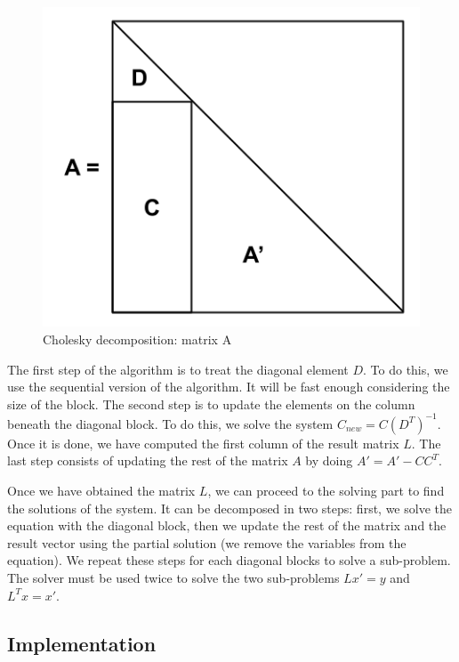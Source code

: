 \begin{figure}[!ht]
  \begin{center}
    \includegraphics[scale=0.4]{img/cho_block_dec_A.png}
    \caption{Cholesky decomposition: matrix A}
    \label{fig:chodeca}
  \end{center}
\end{figure}

The first step of the algorithm is to treat the diagonal element $D$. To do
this, we use the sequential version of the algorithm. It will be fast enough
considering the size of the block. The second step is to update the elements on
the column beneath the diagonal block. To do this, we solve the system $C_{new}
= C(D^{T})^{-1}$. Once it is done, we have computed the first column of the
result matrix $L$. The last step consists of updating the rest of the matrix $A$
by doing $A' = A' - CC^{T}$.

Once we have obtained the matrix $L$, we can proceed to the solving part to find
the solutions of the system. It can be decomposed in two steps: first, we solve
the equation with the diagonal block, then we update the rest of the matrix and
the result vector using the partial solution (we remove the variables from the
equation). We repeat these steps for each diagonal blocks to solve a
sub-problem. The solver must be used twice to solve the two sub-problems  $Lx' =
y$ and $L^{T}x = x'$.

\subsection{Implementation}

